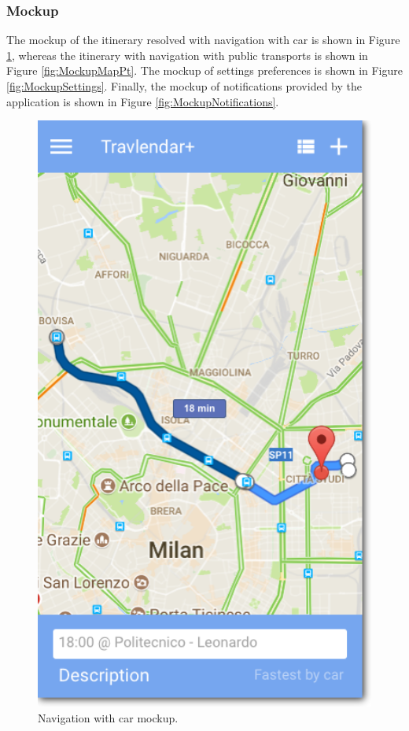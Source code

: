\subsubsection{Mockup}
The mockup of the itinerary resolved with navigation with car is shown in Figure \ref{fig:MockupMapCar}, whereas the itinerary with navigation with public transports is shown in Figure \ref{fig:MockupMapPt}. The mockup of settings preferences is shown in Figure \ref{fig:MockupSettings}. Finally, the mockup of notifications provided by the application is shown in Figure \ref{fig:MockupNotifications}.
\begin{figure}
	\centering
	\includegraphics[width=4.5in]{./images/map_car.png}
	\caption{Navigation with car mockup.}
	\label{fig:MockupMapCar}
\end{figure}

